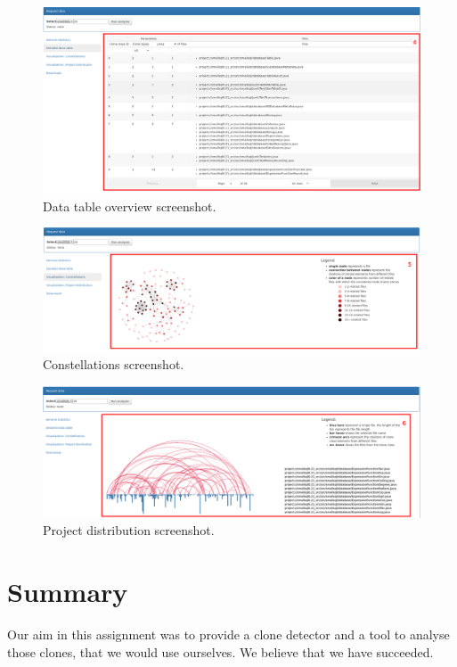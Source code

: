 \documentclass{uva-inf-article}
\begin{document}
\begin{figure}[!htb]
	\includegraphics[width=\textwidth]{visualization2}
	\centering
	\caption{Data table overview screenshot.}
	\label{screenshot2}
\end{figure}

\begin{figure}[!htb]
	\includegraphics[width=\textwidth]{visualization3}
	\centering
	\caption{Constellations screenshot.}
	\label{screenshot3}
\end{figure}

\begin{figure}[!htb]
	\includegraphics[width=\textwidth]{visualization4}
	\centering
	\caption{Project distribution screenshot.}
	\label{screenshot4}
\end{figure}

\section{Summary}
Our aim in this assignment was to provide a clone detector and a tool to analyse those clones, that we would use ourselves. We believe that we have succeeded. 
\end{document}
